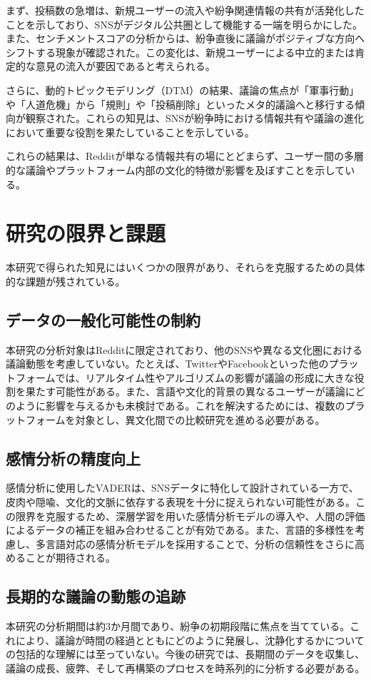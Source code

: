 \documentclass[11pt, a4j]{jreport}
\begin{document}
    まず、投稿数の急増は、新規ユーザーの流入や紛争関連情報の共有が活発化したことを示しており、SNSがデジタル公共圏として機能する一端を明らかにした。また、センチメントスコアの分析からは、紛争直後に議論がポジティブな方向へシフトする現象が確認された。この変化は、新規ユーザーによる中立的または肯定的な意見の流入が要因であると考えられる。
    
    さらに、動的トピックモデリング（DTM）の結果、議論の焦点が「軍事行動」や「人道危機」から「規則」や「投稿削除」といったメタ的議論へと移行する傾向が観察された。これらの知見は、SNSが紛争時における情報共有や議論の進化において重要な役割を果たしていることを示している。

    これらの結果は、Redditが単なる情報共有の場にとどまらず、ユーザー間の多層的な議論やプラットフォーム内部の文化的特徴が影響を及ぼすことを示している。

    \section{研究の限界と課題}
    本研究で得られた知見にはいくつかの限界があり、それらを克服するための具体的な課題が残されている。

    \subsection{データの一般化可能性の制約}
    本研究の分析対象はRedditに限定されており、他のSNSや異なる文化圏における議論動態を考慮していない。たとえば、TwitterやFacebookといった他のプラットフォームでは、リアルタイム性やアルゴリズムの影響が議論の形成に大きな役割を果たす可能性がある。また、言語や文化的背景の異なるユーザーが議論にどのように影響を与えるかも未検討である。これを解決するためには、複数のプラットフォームを対象とし、異文化間での比較研究を進める必要がある。

    \subsection{感情分析の精度向上}
    感情分析に使用したVADERは、SNSデータに特化して設計されている一方で、皮肉や隠喩、文化的文脈に依存する表現を十分に捉えられない可能性がある。この限界を克服するため、深層学習を用いた感情分析モデルの導入や、人間の評価によるデータの補正を組み合わせることが有効である。また、言語的多様性を考慮し、多言語対応の感情分析モデルを採用することで、分析の信頼性をさらに高めることが期待される。

    \subsection{長期的な議論の動態の追跡}
    本研究の分析期間は約3か月間であり、紛争の初期段階に焦点を当てている。これにより、議論が時間の経過とともにどのように発展し、沈静化するかについての包括的な理解には至っていない。今後の研究では、長期間のデータを収集し、議論の成長、疲弊、そして再構築のプロセスを時系列的に分析する必要がある。
\end{document}
